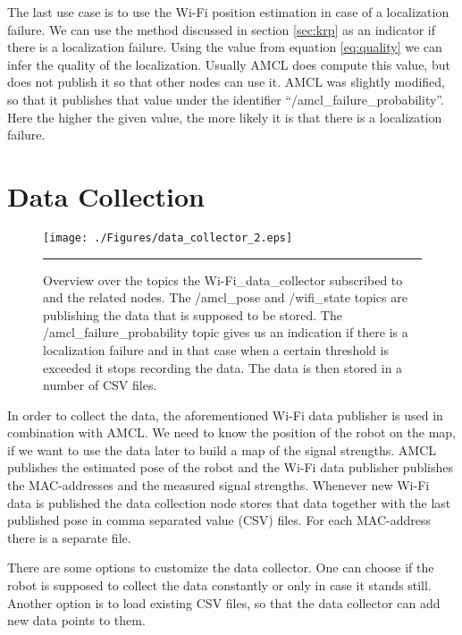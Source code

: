 The last use case is to use the Wi-Fi position estimation in case of a localization failure. We can use the method discussed in section \ref{sec:krp} as an indicator if there is a localization failure. Using the value from equation \ref{eq:quality} we can infer the quality of the localization. Usually AMCL does compute this value, but does not publish it so that other nodes can use it. AMCL was slightly modified, so that it publishes that value under the identifier ``/amcl\_failure\_probability''. Here the higher the given value, the more likely it is that there is a localization failure.

\section{Data Collection}\label{sec:data_coll}
\begin{figure}[htbp]
	\centering
		\texttt{[image: ./Figures/data\_collector\_2.eps]}
		\rule{35em}{0.5pt}
	\caption[Diagram of wifi\_data\_collector]{Overview over the topics the Wi-Fi\_data\_collector subscribed to and the related nodes. The /amcl\_pose and /wifi\_state topics are publishing the data that is supposed to be stored. The /amcl\_failure\_probability topic gives us an indication if there is a localization failure and in that case when a certain threshold is exceeded it stops recording the data. The data is then stored in a number of CSV files.}
	\label{fig:data_collector}
\end{figure}
In order to collect the data, the aforementioned Wi-Fi data publisher is used in combination with AMCL. We need to know the position of the robot on the map, if we want to use the data later to build a map of the signal strengths. AMCL publishes the estimated pose of the robot and the Wi-Fi data publisher publishes the \Gls{MAC-address}es and the measured signal strengths. Whenever new Wi-Fi data is published the data collection node stores that data together with the last published pose in comma separated value (CSV) files. For each \Gls{MAC-address} there is a separate file. 

There are some options to customize the data collector. One can choose if the robot is supposed to collect the data constantly or only in case it stands still. Another option is to load existing CSV files, so that the data collector can add new data points to them. 

